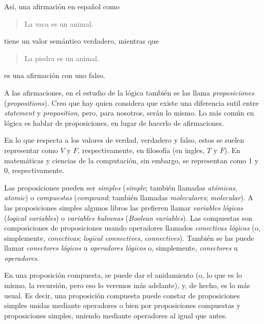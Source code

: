 Así, una afirmación en español como

\begin{quote}
  La vaca es un animal.
\end{quote}

\noindent tiene un valor semántico verdadero, mientras que

\begin{quote}
  La piedra es un animal.
\end{quote}

\noindent es una afirmación con uno falso.

A las afirmaciones, en el estudio de la lógica también se las llama
\emph{proposiciones} (\emph{propositions}). Creo que hay quien considera que
existe una diferencia sutil entre \emph{statement} y \emph{proposition},
pero, para nosotros, serán lo mismo. Lo más común en lógica es hablar de
proposiciones, en lugar de hacerlo de afirmaciones.

En lo que respecta a los valores de verdad, verdadero y falso, estos se
suelen representar como $V$ y $F$, respectivamente, en filosofía (en ingles,
$T$ y $F$). En matemáticas y ciencias de la computación, sin embargo, se
representan como 1 y 0, respectivamente.

Las proposiciones pueden ser \emph{simples} (\emph{simple}; también llamadas
\emph{atómicas}, \emph{atomic}) o \emph{compuestas} (\emph{compound};
también llamadas \emph{moleculares}; \emph{molecular}). A las proposiciones
simples algunos libros las prefieren llamar \emph{variables lógicas}
(\emph{logical variables}) o \emph{variables buleanas} (\emph{Boolean
variables}). Las compuestas son composiciones de proposiciones usando
operadores llamados \emph{conectivas lógicas} (o, simplemente,
\emph{conectivas}; \emph{logical connectives}, \emph{connectives}). También
se las puede llamar \emph{conectores lógicos} u \emph{operadores lógicos} o,
simplemente, \emph{conectores} u \emph{operadores}.

En una proposición compuesta, se puede dar el anidamiento (o, lo que es lo
mismo, la recursión, pero eso lo veremos más adelante), y, de hecho, es lo
más usual. Es decir, una proposición compuesta puede constar de
proposiciones simples unidas mediante operadores o bien por proposiciones
compuestas y proposiciones simples, uniendo mediante operadores al igual que
antes.

\iffalse
Personalmente, la forma que prefiero usar es \emph{operador}, pues por
ejemplo se tiene la negación que no conecta ni une proposiciones, sino que
se usa sobre una sola.
\fi

